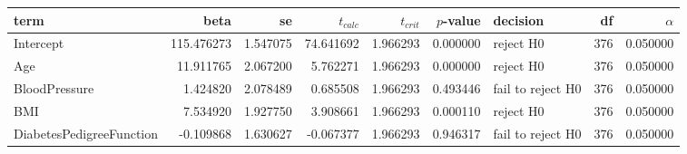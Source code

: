 \begin{tabular}{lrrrrrlrr}
\toprule
term & beta & se & $t_{calc}$ & $t_{crit}$ & $p$-value & decision & df & $\alpha$ \\
\midrule
Intercept & 115.476273 & 1.547075 & 74.641692 & 1.966293 & 0.000000 & reject H0 & 376 & 0.050000 \\
Age & 11.911765 & 2.067200 & 5.762271 & 1.966293 & 0.000000 & reject H0 & 376 & 0.050000 \\
BloodPressure & 1.424820 & 2.078489 & 0.685508 & 1.966293 & 0.493446 & fail to reject H0 & 376 & 0.050000 \\
BMI & 7.534920 & 1.927750 & 3.908661 & 1.966293 & 0.000110 & reject H0 & 376 & 0.050000 \\
DiabetesPedigreeFunction & -0.109868 & 1.630627 & -0.067377 & 1.966293 & 0.946317 & fail to reject H0 & 376 & 0.050000 \\
\bottomrule
\end{tabular}
